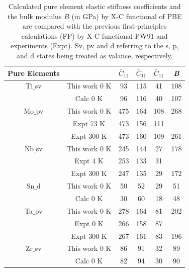 \newpage
\begin{table}[H]
	\caption{Calculated pure element elastic stiffness coefficients and the bulk modulus $B$ (in GPa) by X-C functional of PBE are compared with the previous first-principles calculations (FP) by X-C functional PW91 and experiments (Expt). Sv, pv and d referring to the s, p, and d states being treated as valance, respectively.}
	\centering
	\begin{tabular}{ c c c c c c }
		\hline
		Pure Elements & & $\bar{C}_{11}$ & $\bar{C}_{11}$  & $\bar{C}_{11}$ & \textit{B}\\
		\hline
		Ti$\_$sv & This work 0 K & 93 & 115 & 41 & 108\\
		& Calc 0 K \cite{Shang2010b} & 96 & 116 & 40 & 107\\
		Mo$\_$pv & This work 0 K & 475 & 164 & 108 & 268\\
		& Expt 73 K \cite{Simmons1971b} & 473 & 156 & 111 &\\
		& Expt 300 K \cite{Dickinson1967a} & 473 & 160 & 109 & 261\\
		Nb$\_$sv & This work 0 K & 245 & 144 & 27 & 178\\
		& Expt 4 K \cite{Simmons1971b} & 253 & 133 & 31 & \\
		& Expt 300 K \cite{Bolef1961} & 247 & 135 & 29 & 172\\
		Sn$\_$d & This work 0 K & 50 & 52 & 29 & 51\\
		& Calc 0 K \cite{Shang2010b} & 30 & 60 & 18 & 48\\
		Ta$\_$pv & This work 0 K & 278 & 164 & 81 & 202\\
		& Expt 0 K \cite{Simmons1971b} & 266 & 158 & 87 & \\
		& Expt 300 K \cite{Bolef1961} & 267 & 161 & 83 & 196\\
		Zr$\_$sv & This work 0 K & 86 & 91 & 32 & 89\\
		& Calc 0 K \cite{Shang2010b} & 82 & 94 & 30 & 90\\
		\hline
	\end{tabular}
	\label{Ch5-table:pureeleelas}
\end{table}
\clearpage

